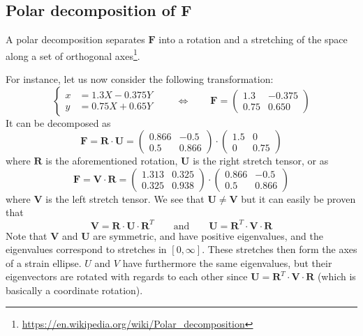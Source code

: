 
\subsection*{Polar decomposition of ${\bm F}$}

A polar decomposition separates ${\bm F}$ into a rotation and a stretching of 
the space along a set of orthogonal axes\footnote{\url{https://en.wikipedia.org/wiki/Polar_decomposition}}. 

For instance, let us now consider the following transformation:
\begin{equation}
\begin{cases} 
x &= 1.3X-0.375Y\\ 
y &= 0.75X+0.65 Y
\end{cases}
\qquad
\Leftrightarrow
\qquad
{\bm F} = 
\left(
\begin{array}{cc}
1.3 & -0.375 \\
0.75 & 0.650
\end{array}
\right)
\end{equation}
It can be decomposed as 
\[
{\bm F} = {\bm R} \cdot {\bm U}
=
\left(
\begin{array}{cc}
0.866 & -0.5 \\
0.5 & 0.866
\end{array}
\right)
\cdot
\left(
\begin{array}{cc}
1.5 & 0 \\
0 & 0.75
\end{array}
\right)
\]
where ${\bm R}$ is the aforementioned rotation,  
${\bm U}$ is the right stretch tensor, or as  
\[
{\bm F} = {\bm V} \cdot {\bm R}
=
\left(
\begin{array}{cc}
1.313 & 0.325 \\
0.325 & 0.938 
\end{array}
\right)
\cdot
\left(
\begin{array}{cc}
0.866 & -0.5 \\
0.5 & 0.866
\end{array}
\right)
\]
where ${\bm V}$ is the left stretch tensor.  
We see that ${\bm U}\ne {\bm V}$ but it can 
easily be proven that 
\[
{\bm V} = {\bm R}\cdot{\bm U}\cdot {\bm R}^T
\qquad
\text{and}
\qquad
{\bm U} = {\bm R}^T\cdot{\bm V}\cdot {\bm R}
\]
Note that  ${\bm V}$ and ${\bm U}$ are symmetric, and have positive eigenvalues, and the 
eigenvalues correspond to stretches in $[0,\infty]$.
These stretches then form the axes of a strain ellipse. 
$U$ and $V$ have furthermore the same eigenvalues, but their eigenvectors are 
rotated with regards to each other since ${\bm U} = {\bm R}^T \cdot {\bm V} \cdot {\bm R}$ (which is basically a coordinate rotation).




